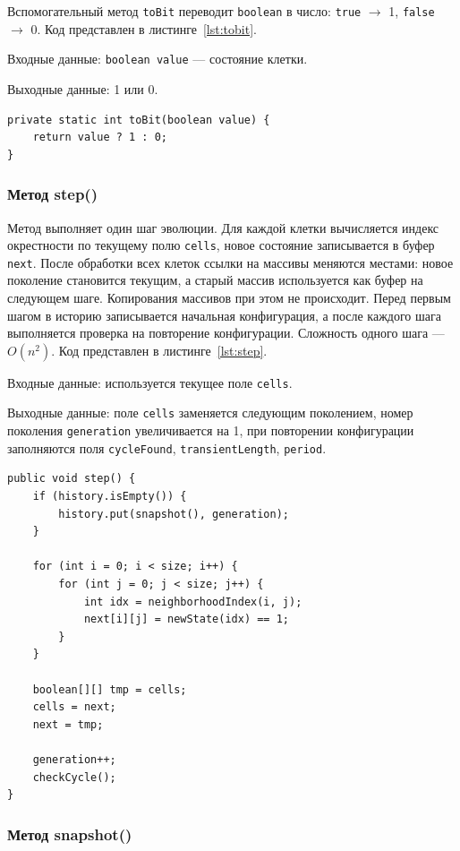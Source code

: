 \documentclass[a4paper,14pt]{extarticle}
\begin{document}
Вспомогательный метод \texttt{toBit} переводит \texttt{boolean} в число: \texttt{true} $\to$ 1, \texttt{false} $\to$ 0. Код представлен в листинге~\ref{lst:tobit}.

Входные данные: \texttt{boolean value} --- состояние клетки.

Выходные данные: 1 или 0.

\begin{lstlisting}[caption={Метод toBit()}, label={lst:tobit}]
private static int toBit(boolean value) {
	return value ? 1 : 0;
}
\end{lstlisting}

\subsubsection*{Метод step()}

Метод выполняет один шаг эволюции. Для каждой клетки вычисляется индекс окрестности по текущему полю \texttt{cells}, новое состояние записывается в буфер \texttt{next}. После обработки всех клеток ссылки на массивы меняются местами: новое поколение становится текущим, а старый массив используется как буфер на следующем шаге. Копирования массивов при этом не происходит. Перед первым шагом в историю записывается начальная конфигурация, а после каждого шага выполняется проверка на повторение конфигурации. Сложность одного шага --- $O(n^2)$. Код представлен в листинге~\ref{lst:step}.

Входные данные: используется текущее поле \texttt{cells}.

Выходные данные: поле \texttt{cells} заменяется следующим поколением, номер поколения \texttt{generation} увеличивается на 1, при повторении конфигурации заполняются поля \texttt{cycleFound}, \texttt{transientLength}, \texttt{period}.

\begin{lstlisting}[caption={Метод step()}, label={lst:step}]
public void step() {
	if (history.isEmpty()) {
		history.put(snapshot(), generation);
	}

	for (int i = 0; i < size; i++) {
		for (int j = 0; j < size; j++) {
			int idx = neighborhoodIndex(i, j);
			next[i][j] = newState(idx) == 1;
		}
	}

	boolean[][] tmp = cells;
	cells = next;
	next = tmp;

	generation++;
	checkCycle();
}
\end{lstlisting}

\subsubsection*{Метод snapshot()}
\end{document}

